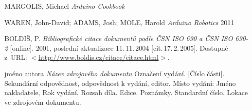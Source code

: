 \begin{literatura}{99}


    MARGOLIS, Michael
    \emph{Arduino Cookbook}

    WAREN, John-David; ADAMS, Josh; MOLE, Harold
    \emph{Arduino Robotics}
    2011
	
    BOLDIŠ, P.
    \emph{Bibliografické citace dokumentů podle ČSN ISO 690 a ČSN ISO 690-2}\/ [online].
    2001, poslední aktualizace 11.\,11.\,2004 [cit.\,17.\,2.\,2005].
    Dostupné z~URL:
    \(<\)\url{http://www.boldis.cz/citace/citace.html}\(>\).


{}
    jméno autora
    \emph{Název zdrojového dokumentu}
    Označení vydání.
    [Číslo části].
    Sekundární odpovědnost, odpovědnost k vydání, editor.
    Místo vydání: Jméno nakladatele, Rok vydání.
    Rozsah díla. Edice. 
    Poznámky. Standardní číslo.
    Lokace ve zdrojovém dokumentu. %
	
\end{literatura}
